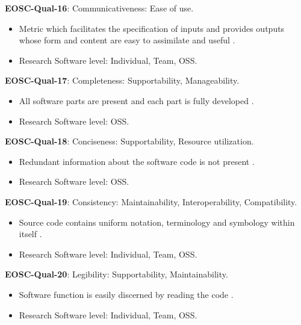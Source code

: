 \textbf{EOSC-Qual-16}: Communicativeness: Ease of use.

\begin{itemize}
    \item Metric which facilitates the specification of inputs and provides outputs whose form and content are easy to assimilate and useful \cite{boehm_quantitative_1976,raymond_software_2013}.
    \item Research Software level: Individual, Team, OSS.
\end{itemize}

\textbf{EOSC-Qual-17}: Completeness: Supportability, Manageability.

\begin{itemize}
    \item All software parts are present and each part is fully developed \cite{iso_25010_2011_2017,boehm_quantitative_1976}.
    \item Research Software level: OSS.
\end{itemize}

\textbf{EOSC-Qual-18}: Conciseness: Supportability, Resource utilization.

\begin{itemize}
    \item Redundant information about the software code is not present \cite{boehm_quantitative_1976}.
    \item Research Software level: OSS.
\end{itemize}

\textbf{EOSC-Qual-19}: Consistency: Maintainability, Interoperability, Compatibility.

\begin{itemize}
    \item Source code contains uniform notation, terminology and symbology within itself \cite{boehm_quantitative_1976,raymond_software_2013}.
    \item Research Software level: Individual, Team, OSS.
\end{itemize}

\textbf{EOSC-Qual-20}: Legibility: Supportability, Maintainability.

\begin{itemize}
    \item Software function is easily discerned by reading the code \cite{boehm_quantitative_1976}.
    \item Research Software level: Individual, Team, OSS.
\end{itemize}

